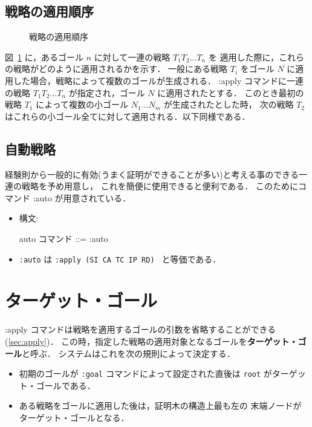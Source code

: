 \documentclass[a4paper,oneside,10pt,here]{memoir}
\newenvironment{vvtm}%
{\parskip=0pt\lineskip=0pt\begin{center}\begin{minipage}{0.8\textwidth}\begin{snugshade}}%
  {\end{snugshade}\end{minipage}\end{center}}
\begin{document}
\subsection{戦略の適用順序}\label{sec:order-of-tatic-application}

\begin{figure}[htbp]
\begin{center}
  
\end{center}
\caption{戦略の適用順序}
\label{fig:apply-tactic}
\end{figure}
図~\ref{fig:apply-tactic} に，あるゴール $n$ に対して一連の戦略 $T_1 T_2 \ldots T_n$ を
適用した際に，これらの戦略がどのように適用されるかを示す．
一般にある戦略 $T_i$ をゴール $N$ に適用した場合，戦略によって複数のゴールが生成される．
:apply コマンドに一連の戦略 $T_1 T_2 \ldots T_n$ が指定され，ゴール $N$ に適用されたとする．
このとき最初の戦略 $T_1$ によって複数の小ゴール $N_1 \ldots N_m$ が生成されたとした時，
次の戦略 $T_2$ はこれらの小ゴール全てに対して適用される．以下同様である．

\subsection{自動戦略} \label{sec:tactic-auto}
経験則から一般的に有効(うまく証明ができることが多い)と考える事のできる一連の戦略を予め用意し，
これを簡便に使用できると便利である．
このためにコマンド :auto が用意されている．

\begin{itemize}
\item 構文:
  \begin{vvtm}
    \begin{simplev}
  auto コマンド ::= :auto      
    \end{simplev}
  \end{vvtm}
\item \verb|:auto| は \verb|:apply (SI CA TC IP RD) | と等価である．
\end{itemize}

\section{ターゲット・ゴール}\label{sec:default-goal}
:apply コマンドは戦略を適用するゴールの引数を省略することができる(\ref{sec:apply})．
この時，指定した戦略の適用対象となるゴールを\textbf{ターゲット・ゴール}と呼ぶ．
システムはこれを次の規則によって決定する．
\begin{itemize}
\item 初期のゴールが \verb|:goal| コマンドによって設定された直後は 
  \verb|root| がターゲット・ゴールである．
\item ある戦略をゴールに適用した後は，証明木の構造上最も左の
  末端ノードがターゲット・ゴールとなる．
\end{itemize}
\end{document}

